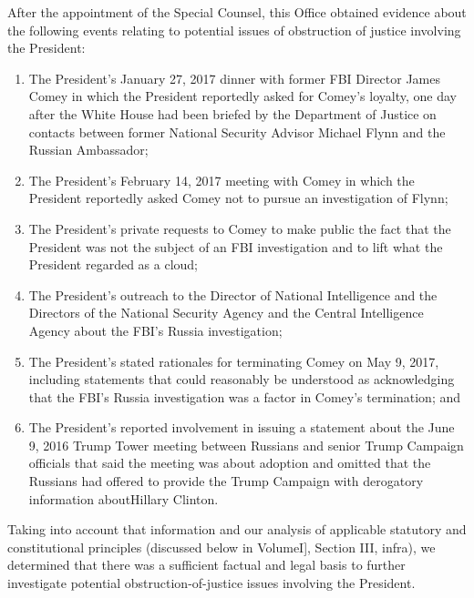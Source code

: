 After the appointment of the Special Counsel, this Office obtained evidence about the following events relating to potential issues of obstruction of justice involving the President:

\begin{enumerate}
    \item The President’s January 27, 2017 dinner with former FBI Director James Comey in which the President reportedly asked for Comey’s loyalty, one day after the White House had been briefed by the Department of Justice on contacts between former National Security Advisor Michael Flynn and the Russian Ambassador;

    \item The President’s February 14, 2017 meeting with Comey in which the President reportedly asked Comey not to pursue an investigation of Flynn;

    \item The President’s private requests to Comey to make public the fact that the President was not the subject of an FBI investigation and to lift what the President regarded as a cloud;

    \item The President’s outreach to the Director of National Intelligence and the Directors of the National Security Agency and the Central Intelligence Agency about the FBI’s Russia investigation;

    \item The President’s stated rationales for terminating Comey on May 9, 2017, including statements that could reasonably be understood as acknowledging that the FBI’s Russia investigation was a factor in Comey’s termination; and

    \item The President’s reported involvement in issuing a statement about the June 9, 2016 Trump Tower meeting between Russians and senior Trump Campaign officials that said the meeting was about adoption and omitted that the Russians had offered to provide the Trump Campaign with derogatory information aboutHillary Clinton.
\end{enumerate}

Taking into account that information and our analysis of applicable statutory and constitutional principles (discussed below in VolumeI], Section III, infra), we determined that there was a sufficient factual and legal basis to further investigate potential obstruction-of-justice issues involving the President.

